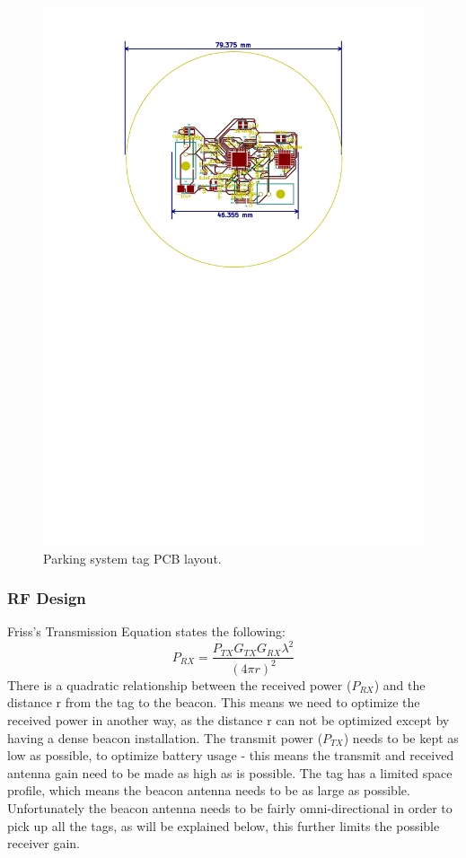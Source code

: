 \begin{figure}[H]
\begin{center}
\includegraphics[trim={4cm 15cm 4cm 1cm},clip]{data/pcb-layout.pdf}
\caption{Parking system tag PCB layout.}
\end{center}
\end{figure}

\newpage
\subsubsection{RF Design}



Friss's Transmission Equation states the following:
$$P_{RX} = \frac{P_{TX}G_{TX}G_{RX} \lambda^2}{(4 \pi r)^2}$$
There is a quadratic relationship between the received power ($P_{RX}$) and the distance r from the tag to the beacon. This means we need to optimize the received power in another way, as the distance r can not be optimized except by having a dense beacon installation. The transmit power ($P_{TX}$) needs to be kept as low as possible, to optimize battery usage - this means the transmit and received antenna gain need to be made as high as is possible. The tag has a limited space profile, which means the beacon antenna needs to be as large as possible. Unfortunately the beacon antenna needs to be fairly omni-directional in order to pick up all the tags, as will be explained below, this further limits the possible receiver gain.

